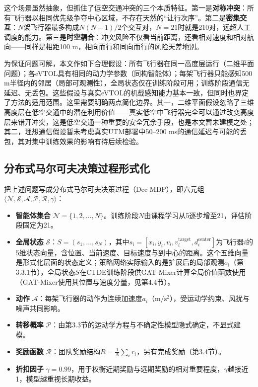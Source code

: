\documentclass[12pt,a4paper,UTF8]{ctexart}
\begin{document}
这个场景虽然抽象，但抓住了低空交通冲突的三个本质特征。第一是\textbf{对称冲突}：所有飞行器以相同优先级争夺中心区域，不存在天然的“让行次序”。第二是\textbf{密集交互}：$N$架飞行器最多构成$N(N-1)/2$个交互对，$N=21$时就是210对，远超人工调度的能力。第三是\textbf{时空耦合}：冲突风险不仅看当前距离，还看相对速度和相对航向——同样是相距100 m，相向而行和同向而行的风险天差地别。

为保证问题可解，本文作如下合理假设：所有飞行器在同一高度层运行（二维平面问题）；各eVTOL具有相同的动力学参数（同构智能体）；每架飞行器只能感知500 m半径内的邻居（局部可观测性），全局状态仅在训练阶段可用；训练阶段通信无延迟、无丢包。这些假设与真实eVTOL的机载感知能力基本一致，但同时也界定了方法的适用范围。这里需要明确两点简化边界。其一，二维平面假设忽略了三维高度层在低空交通中的潜在利用价值——真实低空中飞行器完全可以通过改变高度层来错开冲突，这是低空交通一种重要的安全冗余手段，也是本文暂未建模之处；其二，理想通信假设暂未考虑真实UTM部署中50--200 ms的通信延迟与可能的丢包，其对集中训练效果的影响有待后续检验。

\subsection{分布式马尔可夫决策过程形式化}

把上述问题写成分布式马尔可夫决策过程（Dec-MDP）\cite{ref41}，即六元组$\langle \mathcal{N}, \allowbreak \mathcal{S}, \allowbreak \mathcal{A}, \allowbreak \mathcal{P}, \allowbreak \mathcal{R}, \allowbreak \gamma \rangle$：

\begin{itemize}
    \item \textbf{智能体集合} $\mathcal{N} = \{1, 2, \ldots, N\}$。训练阶段$N$由课程学习从5逐步增至21，评估阶段固定为21。
    \item \textbf{全局状态} $\mathcal{S}$：$S = (s_1, \ldots, s_N)$，其中$s_i = [x_i, y_i, v_i, v_i^{\text{target}}, d_i^{\text{center}}]$为飞行器$i$的5维状态向量，含位置、当前速度、目标速度与到中心的距离。这个五维向量是形式化层面的状态定义；策略网络实际输入的是扩展后的局部观测$o_i$（第3.3.1节），全局状态$S$在CTDE训练阶段供GAT-Mixer计算全局价值函数使用（GAT-Mixer使用其位置与速度分量，见第4.4节）。
    \item \textbf{动作} $\mathcal{A}$：每架飞行器的动作为连续加速度$a_i$（$\mathrm{m/s^2}$），受运动学约束、风扰与噪声共同影响。
    \item \textbf{转移概率} $\mathcal{P}$：由第3.3节的运动学方程与不确定性模型隐式确定，不显式建模。
    \item \textbf{奖励函数} $\mathcal{R}$：团队奖励结构$R = \frac{1}{N}\sum_i r_i$，另有完成奖励（第3.4节）。
    \item \textbf{折扣因子} $\gamma = 0.99$，用于权衡近期奖励与远期奖励的相对重要程度，$\gamma$越接近1，模型越重视长期收益。
\end{itemize}
\end{document}
